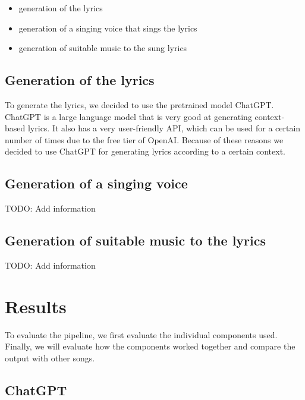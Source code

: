 \begin{itemize}
    
    \item generation of the lyrics
    \item generation of a singing voice that sings the lyrics
    \item generation of suitable music to the sung lyrics

\end{itemize}

\section{Generation of the lyrics}
\label{sec:generation_of_the_lyrics}

To generate the lyrics, we decided to use the pretrained model ChatGPT. ChatGPT is a large language model that is very good at generating context-based lyrics. It also has a very user-friendly API, which can be used for a certain number of times due to the free tier of OpenAI. Because of these reasons we decided to use ChatGPT for generating lyrics according to a certain context.

\section{Generation of a singing voice}
\label{sec:generation_of_a_singing_voice}

TODO: Add information

\section{Generation of suitable music to the lyrics}
\label{sec:generation_of_suitable_music_to_the_lyrics}

TODO: Add information

\chapter{Results}
\label{chap:results}

To evaluate the pipeline, we first evaluate the individual components used. Finally, we will evaluate how the components worked together and compare the output with other songs.

\section{ChatGPT}
\label{sec:ChatGPT}

